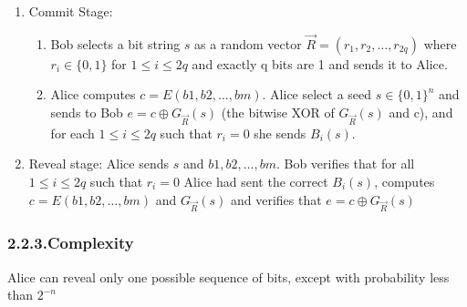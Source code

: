 \documentclass{article}
\begin{document}
\begin{enumerate}[noitemsep,topsep=\mdcompacttopsep,label=\Alph*.]%

\item{}Commit Stage:

\begin{enumerate}[noitemsep,topsep=\mdcompacttopsep]%

\item{}Bob selects a bit string $s$ as a random vector $\vec{R} = (r_1, r_2, \dots, r_{2q})$ where $r_i \in \{0, 1\}$
for $1 \leq i \leq 2q$ and exactly q bits are 1 and sends it to Alice.%

\item{}Alice computes $c = E(b1, b2,\dots, bm)$. Alice select a seed $s \in \{0, 1\}^n$
and sends to Bob $e = c \oplus G_{\vec{R}}(s)$  (the bitwise XOR of $G_{\vec{R}}(s)$ and
c), and for each $1 \leq i \leq 2q$ such that $r_i = 0$ she sends $B_i(s)$.%
\end{enumerate}%

\item{}Reveal stage: Alice sends $s$ and $b1, b2,\dots, bm$. Bob verifies that for all
$1 \leq i \leq 2q$ such that $r_i = 0$ Alice had sent the correct $B_i(s)$, computes
$c = E(b1, b2,\dots, bm)$ and $G_{\vec{R}}(s)$ and verifies that $e = c \oplus G_{\vec{R}}(s)$%
\end{enumerate}%

\subsubsection{2.2.3.\hspace*{0.5em}Complexity}\label{sec-complexity}%

\noindent{}Alice can reveal only one possible sequence of bits, except with probability less than $2^{−n}$%
\end{document}
